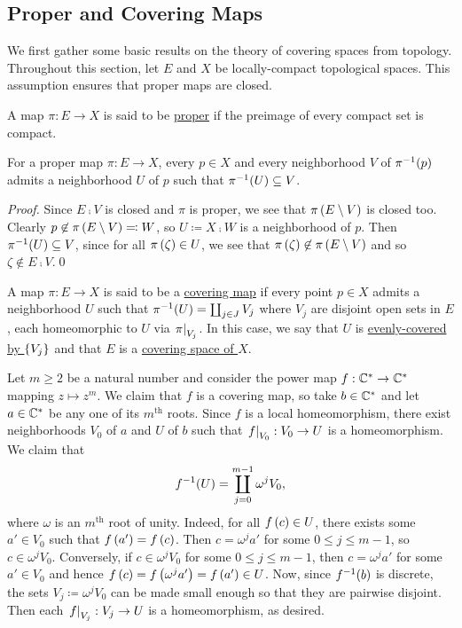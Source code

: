 \documentclass[../Moduli_Spaces_of_Riemann_Surfaces.tex]{subfiles}
\begin{document}
    \subsection{Proper and Covering Maps}
    We first gather some basic results on the theory of covering spaces from topology. Throughout this section, let $E$ and $X$ be locally-compact topological spaces. This assumption ensures that proper maps are closed.
    \begin{definition}
        A map $\pi:E\to X$ is said to be \ul{proper} if the preimage of every compact set is compact.
    \end{definition}
    \begin{proposition}\label{CS:prp:proper_give_neighborhoods}
        For a proper map $\pi:E\to X$, every $p\in X$ and every neighborhood $V$ of $\pi^{-1}\!\left(p\right)$ admits a neighborhood $U$ of $p$ such that $\pi^{-1}\!\left(U\right)\subseteq V$.
    \end{proposition}
    \begin{proof}
        Since $E\comp V$ is closed and $\pi$ is proper, we see that $\pi\left(E\setminus V\right)$ is closed too. Clearly $p\not\in\pi\left(E\setminus V\right)\eqqcolon W$, so $U\coloneqq X\comp W$ is a neighborhood of $p$. Then $\pi^{-1}\!\left(U\right)\subseteq V$, since for all $\pi\left(\zeta\right)\in U$, we see that $\pi\left(\zeta\right)\not\in\pi\left(E\setminus V\right)$ and so $\zeta\not\in E\comp V$.\qed
    \end{proof}
    \begin{definition}
        A map $\pi:E\to X$ is said to be a \ul{covering map} if every point $p\in X$ admits a neighborhood $U$ such that $\pi^{-1}\!\left(U\right)=\coprod_{j\in J}V_j$ where $V_j$ are disjoint open sets in $E$, each homeomorphic to $U$ via $\left.\pi\right|_{V_j}$. In this case, we say that $U$ is \ul{evenly-covered by $\left\{V_j\right\}$} and that $E$ is a \ul{covering space of $X$}.
    \end{definition}
    \begin{example}\label{CS:exa:power_map}
        Let $m\geq2$ be a natural number and consider the power map $f:\mathbb{C}^\ast\to\mathbb{C}^\ast$ mapping $z\mapsto z^m$. We claim that $f$ is a covering map, so take $b\in\mathbb{C}^\ast$ and let $a\in\mathbb{C}^\ast$ be any one of its $m^\textrm{th}$ roots. Since $f$ is a local homeomorphism, there exist neighborhoods $V_0$ of $a$ and $U$ of $b$ such that $\left.f\right|_{V_0}:V_0\to U$ is a homeomorphism. We claim that
        \begin{equation*}
            f^{-1}\!\left(U\right)=\coprod_{j=0}^{m-1}\omega^jV_0,
        \end{equation*}
        where $\omega$ is an $m^\textrm{th}$ root of unity. Indeed, for all $f\left(c\right)\in U$, there exists some $a'\in V_0$ such that $f\left(a'\right)=f\left(c\right)$. Then $c=\omega^ja'$ for some $0\leq j\leq m-1$, so $c\in\omega^jV_0$. Conversely, if $c\in\omega^jV_0$ for some $0\leq j\leq m-1$, then $c=\omega^ja'$ for some $a'\in V_0$ and hence $f\left(c\right)=f\left(\omega^ja'\right)=f\left(a'\right)\in U$. Now, since $f^{-1}\!\left(b\right)$ is discrete, the sets $V_j\coloneqq\omega^jV_0$ can be made small enough so that they are pairwise disjoint. Then each $\left.f\right|_{V_j}:V_j\to U$ is a homeomorphism, as desired.\exqed
    \end{example}
\end{document}

